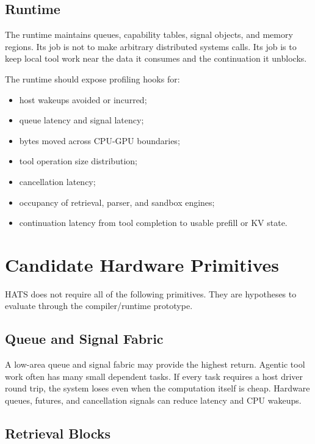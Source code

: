 \documentclass[11pt]{article}
\begin{document}
\subsection{Runtime}

The runtime maintains queues, capability tables, signal objects, and memory
regions. Its job is not to make arbitrary distributed systems calls. Its job is
to keep local tool work near the data it consumes and the continuation it
unblocks.

The runtime should expose profiling hooks for:

\begin{itemize}[leftmargin=*]
  \item host wakeups avoided or incurred;
  \item queue latency and signal latency;
  \item bytes moved across CPU-GPU boundaries;
  \item tool operation size distribution;
  \item cancellation latency;
  \item occupancy of retrieval, parser, and sandbox engines;
  \item continuation latency from tool completion to usable prefill or KV state.
\end{itemize}

\section{Candidate Hardware Primitives}

HATS does not require all of the following primitives. They are hypotheses to
evaluate through the compiler/runtime prototype.

\subsection{Queue and Signal Fabric}

A low-area queue and signal fabric may provide the highest return. Agentic tool
work often has many small dependent tasks. If every task requires a host driver
round trip, the system loses even when the computation itself is cheap. Hardware
queues, futures, and cancellation signals can reduce latency and CPU wakeups.

\subsection{Retrieval Blocks}
\end{document}
